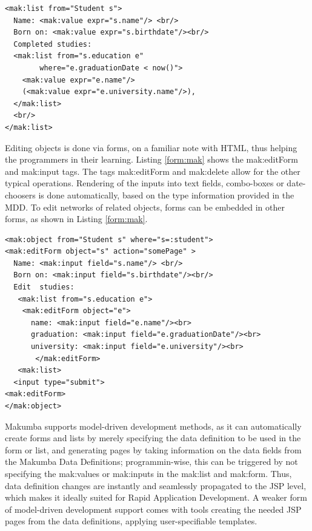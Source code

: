 \documentclass{llncs}
\begin{document}
\lstset{basicstyle=\small, captionpos=b, caption=Example of viewing data with the Makumba JSP tag library, label=list:mak, frame=shadowbox}
\begin{lstlisting}
<mak:list from="Student s">
  Name: <mak:value expr="s.name"/> <br/>
  Born on: <mak:value expr="s.birthdate"/><br/>
  Completed studies:
  <mak:list from="s.education e"
  	    where="e.graduationDate < now()">
    <mak:value expr="e.name"/>
    (<mak:value expr="e.university.name"/>),
  </mak:list>
  <br/>
</mak:list>
\end{lstlisting}


Editing objects is done via forms, on a familiar note with HTML, thus helping the programmers in their learning.  Listing  \ref{form:mak} shows the mak:editForm and mak:input tags. The tags mak:editForm and mak:delete allow for the other typical operations. Rendering of the inputs into text fields, combo-boxes or date-choosers is done automatically, based on the type information provided in the MDD. To edit networks of related objects, forms can be embedded in other forms, as shown in Listing \ref{form:mak}.

\lstset{basicstyle=\small, captionpos=b, caption=Example of changing data with the Makumba JSP tag library, label=form:mak, frame=shadowbox}
\begin{lstlisting}
<mak:object from="Student s" where="s=:student">
<mak:editForm object="s" action="somePage" >
  Name: <mak:input field="s.name"/> <br/>
  Born on: <mak:input field="s.birthdate"/><br/>
  Edit  studies:
   <mak:list from="s.education e"> 
   	<mak:editForm object="e">
   	  name: <mak:input field="e.name"/><br>      
	  graduation: <mak:input field="e.graduationDate"/><br>      
	  university: <mak:input field="e.university"/><br>
       </mak:editForm>
   <mak:list>
  <input type="submit">
<mak:editForm>
</mak:object>
\end{lstlisting}

Makumba supports model-driven development methods, as it can automatically create forms and lists by merely specifying the data definition to be used in the form or list, and generating pages by taking information on the data fields from the Makumba Data Definitions; programmin-wise, this can be triggered by not specifying the mak:values or mak:inputs in the mak:list and mak:form. Thus, data definition changes are instantly and seamlessly propagated to the JSP level, which makes it ideally suited for Rapid Application Development. A weaker form of model-driven development support comes with tools creating the needed JSP pages from the data definitions, applying user-specifiable templates.
\end{document}
